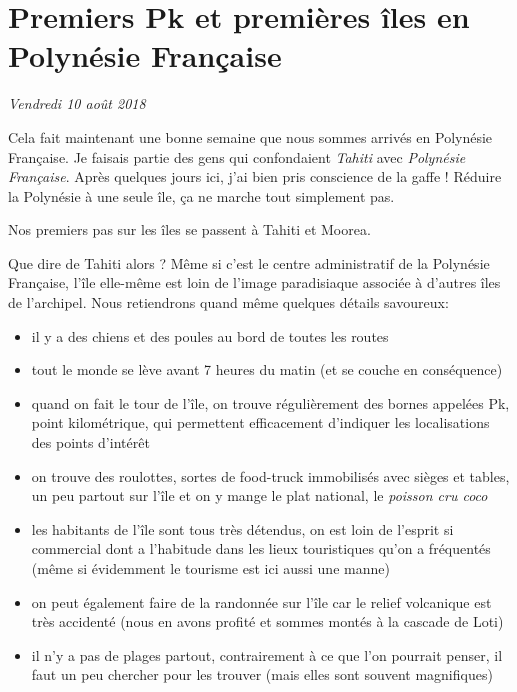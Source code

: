 \hypertarget{premiers-pk-et-premiuxe8res-uxeeles-en-polynuxe9sie-franuxe7aise}{%
\section{Premiers Pk et premières îles en Polynésie
Française}\label{premiers-pk-et-premiuxe8res-uxeeles-en-polynuxe9sie-franuxe7aise}}

\emph{Vendredi 10 août 2018}

Cela fait maintenant une bonne semaine que nous sommes arrivés en
Polynésie Française. Je faisais partie des gens qui confondaient
\emph{Tahiti} avec \emph{Polynésie Française}. Après quelques jours ici,
j'ai bien pris conscience de la gaffe ! Réduire la Polynésie à une seule
île, ça ne marche tout simplement pas.

Nos premiers pas sur les îles se passent à Tahiti et Moorea.

\hypertarget{mapid}{}

Que dire de Tahiti alors ? Même si c'est le centre administratif de la
Polynésie Française, l'île elle-même est loin de l'image paradisiaque
associée à d'autres îles de l'archipel. Nous retiendrons quand même
quelques détails savoureux:

\begin{itemize}
\tightlist
\item
  il y a des chiens et des poules au bord de toutes les routes
\item
  tout le monde se lève avant 7 heures du matin (et se couche en
  conséquence)
\item
  quand on fait le tour de l'île, on trouve régulièrement des bornes
  appelées Pk, point kilométrique, qui permettent efficacement
  d'indiquer les localisations des points d'intérêt
\item
  on trouve des roulottes, sortes de food-truck immobilisés avec sièges
  et tables, un peu partout sur l'île et on y mange le plat national, le
  \emph{poisson cru coco}
\item
  les habitants de l'île sont tous très détendus, on est loin de
  l'esprit si commercial dont a l'habitude dans les lieux touristiques
  qu'on a fréquentés (même si évidemment le tourisme est ici aussi une
  manne)
\item
  on peut également faire de la randonnée sur l'île car le relief
  volcanique est très accidenté (nous en avons profité et sommes montés
  à la cascade de Loti)
\item
  il n'y a pas de plages partout, contrairement à ce que l'on pourrait
  penser, il faut un peu chercher pour les trouver (mais elles sont
  souvent magnifiques)
\end{itemize}

